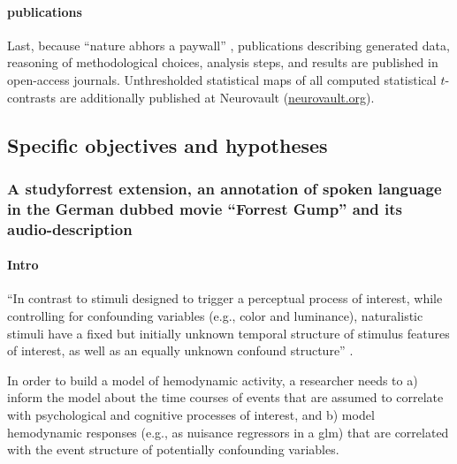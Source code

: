 \paragraph{publications}
Last, because ``nature abhors a paywall'' \citep{dupre2020nature}, publications
describing generated data, reasoning of methodological choices, analysis steps,
and results are published in open-access journals.
Unthresholded statistical maps of all computed statistical $t$-contrasts are
additionally published at Neurovault
(\href{https://neurovault.org/}{neurovault.org}).


\subsection{Specific objectives and hypotheses}




\subsubsection{A studyforrest extension, an annotation of spoken language in the
German dubbed movie ``Forrest Gump'' and its audio-description}


\paragraph{Intro}


``In contrast to stimuli designed to trigger a perceptual process of interest,
while controlling for confounding variables (e.g., color and luminance),
naturalistic stimuli have a fixed but initially unknown temporal structure of
stimulus features of interest, as well as an equally unknown confound
structure'' \citep{haeusler2021speechanno}.

%
In order to build a model of hemodynamic activity, a researcher needs to a)
inform the model about the time courses of events that are assumed to correlate
with psychological and cognitive processes of interest, and b) model hemodynamic
responses (e.g., as nuisance regressors in a \ac{glm}) that are correlated with
the event structure of potentially confounding variables.

